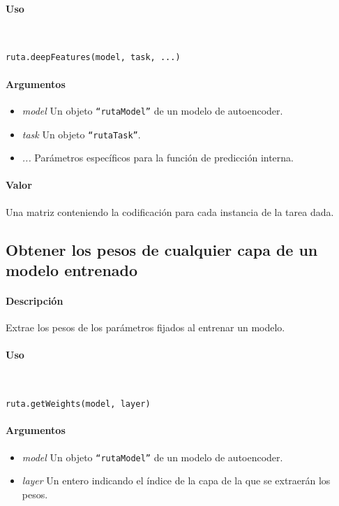\paragraph{Uso}
~

\begin{lstlisting}
ruta.deepFeatures(model, task, ...)
\end{lstlisting}

\paragraph{Argumentos}
\begin{itemize}
\item \emph{model}	Un objeto \texttt{``rutaModel''} de un modelo de autoencoder.
\item \emph{task}	Un objeto \texttt{``rutaTask''}.
\item \emph{...}	Parámetros específicos para la función de predicción interna.
\end{itemize}

\paragraph{Valor}
Una matriz conteniendo la codificación para cada instancia de la tarea dada.


\subsection{Obtener los pesos de cualquier capa de un modelo entrenado}

\paragraph{Descripción}
Extrae los pesos de los parámetros fijados al entrenar un modelo.

\paragraph{Uso}
~

\begin{lstlisting}
ruta.getWeights(model, layer)
\end{lstlisting}

\paragraph{Argumentos}
\begin{itemize}
\item \emph{model}	Un objeto \texttt{``rutaModel''} de un modelo de autoencoder.
\item \emph{layer}	Un entero indicando el índice de la capa de la que se extraerán los pesos.
\end{itemize}

